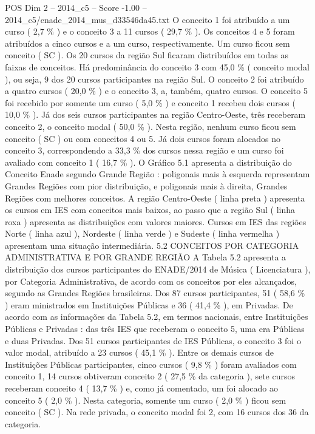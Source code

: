 \begin{textsample}{POS Dim 2 – 2014\_c5 – Score -1.00 – 2014\_c5/enade\_2014\_mus\_d33546da45.txt}
O conceito 1 foi atribuído a um curso ( 2,7 \% ) e o conceito 3 a 11 cursos ( 29,7 \% ).
Os conceitos 4 e 5 foram atribuídos a cinco cursos e a um curso, respectivamente.
Um curso ficou sem conceito ( SC ).
Os 20 cursos da região Sul ficaram distribuídos em todas as faixas de conceitos.
Há predominância do conceito 3 com 45,0 \% ( conceito modal ), ou seja, 9 dos 20 cursos participantes na região Sul.
O conceito 2 foi atribuído a quatro cursos ( 20,0 \% ) e o conceito 3, a, também, quatro cursos.
O conceito 5 foi recebido por somente um curso ( 5,0 \% ) e conceito 1 recebeu dois cursos ( 10,0 \% ).
Já dos seis cursos participantes na região Centro-Oeste, três receberam conceito 2, o conceito modal ( 50,0 \% ).
Nesta região, nenhum curso ficou sem conceito ( SC ) ou com conceitos 4 ou 5.
Já dois cursos foram alocados no conceito 3, correspondendo a 33,3 \% dos cursos nessa região e um curso foi avaliado com conceito 1 ( 16,7 \% ).
O Gráfico 5.1 apresenta a distribuição do Conceito Enade segundo Grande Região : poligonais mais à esquerda representam Grandes Regiões com pior distribuição, e poligonais mais à direita, Grandes Regiões com melhores conceitos.
A região Centro-Oeste ( linha preta ) apresenta os cursos em IES com conceitos mais baixos, ao passo que a região Sul ( linha roxa ) apresenta as distribuições com valores maiores.
Cursos em IES das regiões Norte ( linha azul ), Nordeste ( linha verde ) e Sudeste ( linha vermelha ) apresentam uma situação intermediária. 5.2 CONCEITOS POR CATEGORIA ADMINISTRATIVA E POR GRANDE REGIÃO A Tabela 5.2 apresenta a distribuição dos cursos participantes do ENADE/2014 de Música ( Licenciatura ), por Categoria Administrativa, de acordo com os conceitos por eles alcançados, segundo as Grandes Regiões brasileiras.
Dos 87 cursos participantes, 51 ( 58,6 \% ) eram ministrados em Instituições Públicas e 36 ( 41,4 \% ), em Privadas.
De acordo com as informações da Tabela 5.2, em termos nacionais, entre Instituições Públicas e Privadas : das três IES que receberam o conceito 5, uma era Públicas e duas Privadas.
Dos 51 cursos participantes de IES Públicas, o conceito 3 foi o valor modal, atribuído a 23 cursos ( 45,1 \% ).
Entre os demais cursos de Instituições Públicas participantes, cinco cursos ( 9,8 \% ) foram avaliados com conceito 1, 14 cursos obtiveram conceito 2 ( 27,5 \% da categoria ), sete cursos receberam conceito 4 ( 13,7 \% ) e, como já comentado, um foi alocado ao conceito 5 ( 2,0 \% ).
Nesta categoria, somente um curso ( 2,0 \% ) ficou sem conceito ( SC ).
Na rede privada, o conceito modal foi 2, com 16 cursos dos 36 da categoria.

\end{textsample}
